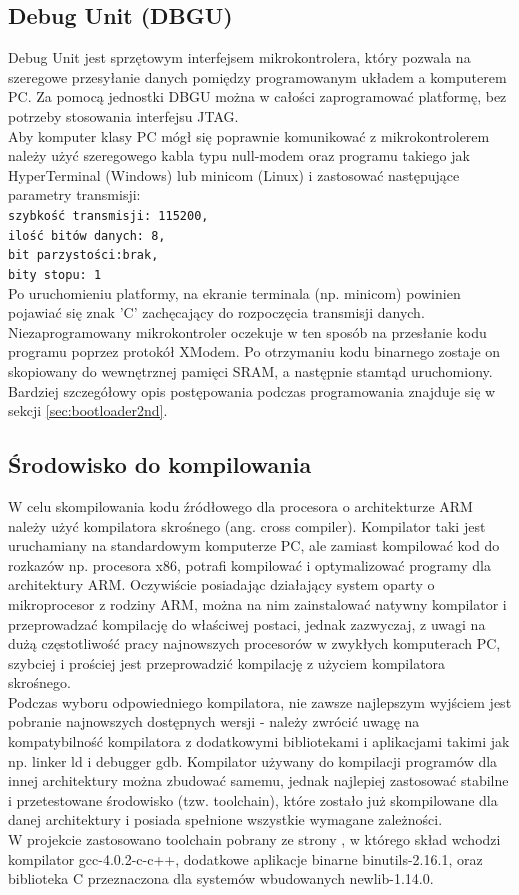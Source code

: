 \documentclass[a4paper,12pt]{book}
\begin{document}
			\subsection{Debug Unit (DBGU)}
				Debug Unit jest sprzętowym interfejsem mikrokontrolera, który pozwala na szeregowe przesyłanie danych pomiędzy programowanym układem a komputerem PC. Za pomocą jednostki DBGU można w całości zaprogramować platformę, bez potrzeby stosowania interfejsu JTAG.\\
				Aby komputer klasy PC mógł się poprawnie komunikować z mikrokontrolerem należy użyć szeregowego kabla typu null-modem oraz programu takiego jak HyperTerminal (Windows) lub minicom (Linux) i zastosować następujące parametry transmisji:\\
				\texttt{szybkość transmisji: 115200,\\ilość bitów danych: 8,\\bit parzystości:brak,\\bity stopu: 1}\\
				Po uruchomieniu platformy, na ekranie terminala (np. minicom) powinien pojawiać się znak 'C' zachęcający do rozpoczęcia transmisji danych. Niezaprogramowany mikrokontroler oczekuje w ten sposób na przesłanie kodu programu poprzez protokół XModem. Po otrzymaniu kodu binarnego zostaje on skopiowany do wewnętrznej pamięci SRAM, a następnie stamtąd uruchomiony.\\
				Bardziej szczegółowy opis postępowania podczas programowania znajduje się w sekcji \ref{sec:bootloader2nd}.
			\subsection{Środowisko do kompilowania}
				W celu skompilowania kodu źródłowego dla procesora o architekturze ARM należy użyć kompilatora skrośnego (ang. cross compiler). Kompilator taki jest uruchamiany na standardowym komputerze PC, ale zamiast kompilować kod do rozkazów np. procesora x86, potrafi kompilować i optymalizować programy dla architektury ARM. Oczywiście posiadając działający system oparty o mikroprocesor z rodziny ARM, można na nim zainstalować natywny kompilator i przeprowadzać kompilację do właściwej postaci, jednak zazwyczaj, z uwagi na dużą częstotliwość pracy najnowszych procesorów w zwykłych komputerach PC, szybciej i prościej jest przeprowadzić kompilację z użyciem kompilatora skrośnego.\\
				Podczas wyboru odpowiedniego kompilatora, nie zawsze najlepszym wyjściem jest pobranie najnowszych dostępnych wersji - należy zwrócić uwagę na kompatybilność kompilatora z dodatkowymi bibliotekami i aplikacjami takimi jak np. linker ld i debugger gdb. Kompilator używany do kompilacji programów dla innej architektury można zbudować samemu, jednak najlepiej zastosować stabilne i przetestowane środowisko (tzw. toolchain), które zostało już skompilowane dla danej architektury i posiada spełnione wszystkie wymagane zależności.\\
				W projekcie zastosowano toolchain pobrany ze strony \cite{website:gnuarm}, w którego skład wchodzi kompilator gcc-4.0.2-c-c++, dodatkowe aplikacje binarne binutils-2.16.1, oraz biblioteka C przeznaczona dla systemów wbudowanych newlib-1.14.0.
\end{document}

